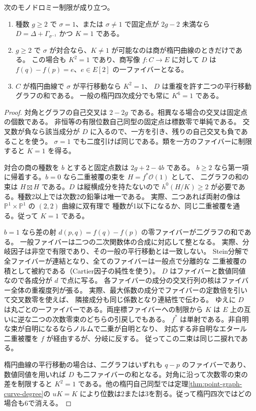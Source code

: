 \begin{corollary}\label{cor:curve-divisor-monodromy}
次のモノドロミー制限が成り立つ。
\begin{enumerate}
\item 種数 $g\ge2$ で $\sigma=1$、または $\sigma\ne1$ で固定点が $2g-2$ 未満なら
$D=\Delta+\Gamma_{\sigma^{-1}}$ かつ $K=1$ である。
\item $g\ge2$ で $\sigma$ が対合なら、$K\ne1$ が可能なのは商が楕円曲線のときだけである。
この場合も $K^2=1$ であり、商写像 $f:C\to E$ に対して $D$ は
$f(q)-f(p)=e$、$e\in E[2]$ の一ファイバーとなる。
\item $C$ が楕円曲線で $\sigma$ が平行移動なら $K^2=1$、
$D$ は重複を許す二つの平行移動グラフの和である。
一般の楕円四次成分でも常に $K^6=1$ である。
\end{enumerate}
\end{corollary}
\begin{proof}
対角とグラフの自己交叉は $2-2g$ である。相異なる場合の交叉は固定点の個数である。
非恒等の有限位数自己同型の固定点は標数零で単純である。
交叉数が負なら該当成分が $D$ に入るので、一方を引き、残りの自己交叉も負であることを使う。
$\sigma=1$ でも二度引けば同じである。類を一方のファイバーに制限すると $K=1$ を得る。

対合の商の種数を $b$ とすると固定点数は $2g+2-4b$ である。
$b\ge2$ なら第一項に帰着する。$b=0$ なら二重被覆の束を $H=f^*\mathcal O(1)$ として、
二グラフの和の束は $H\boxtimes H$ である。$D$ は縦横成分を持たないので
$h^0(H/K)\ge2$ が必要である。種数2以上では次数2の鉛筆は唯一である。
実際、二つあれば両射の像は $\mathbb P^1\times\mathbb P^1$ の $(2,2)$ 曲線に双有理で
種数が1以下になるか、同じ二重被覆を通る。従って $K=1$ である。

$b=1$ なら差の射 $d(p,q)=f(q)-f(p)$ の零ファイバーが二グラフの和である。
一般ファイバーは二つの二次関数体の合成に対応して整となる。
実際、分岐因子は非空で有限であり、その一般の平行移動とは一致しない。
Stein分解で全ファイバーが連結となり、全てのファイバーは一般点で分離的な
二重被覆の積として被約である（Cartier因子の純性を使う）。
$D$ はファイバーと数値同値なので各成分が $d$ で点に写る。
各ファイバーの成分の交叉行列の核はファイバー全体の重複度列が張る。
実際、最大係数の成分でファイバーの定数倍を引いて交叉数零を使えば、
隣接成分も同じ係数となり連結性で伝わる。
ゆえに $D$ は丸ごとの一ファイバーである。両座標ファイバーへの制限から
$K$ は $E$ 上の互いに逆な二つの次数零束のどちらの引戻しでもある。
$f^*$ は単射である。非自明な束が自明になるならノルムで二乗が自明となり、
対応する非自明なエタール二重被覆を $f$ が経由するが、分岐に反する。
従ってこの二束は同じ二捩れである。

楕円曲線の平行移動の場合は、二グラフはいずれも $q-p$ のファイバーであり、
数値同値を用いれば $D$ も二ファイバーの和となる。対角に沿って次数零の束の差を制限すると
$K^2=1$ である。他の楕円自己同型では定理\ref{thm:point-graph-curve-degree}の
$uK=K$ により位数は2または3を割る。従って楕円四次ではどの場合も6で消える。
\end{proof}

